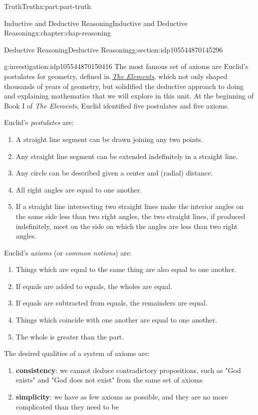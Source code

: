\documentclass[oneside,10pt,]{book}
\newcommand{\terminology}[1]{\textbf{#1}}
\numberwithin{equation}{section}
\begin{document}
\begin{partptx}{Truth}{}{Truth}{}{}{x:part:part-truth}
\begin{chapterptx}{Inductive and Deductive Reasoning}{}{Inductive and Deductive Reasoning}{}{}{x:chapter:chap-reasoning}
\begin{sectionptx}{Deductive Reasoning}{}{Deductive Reasoning}{}{}{g:section:idp105544870145296}
\begin{investigation}{}{g:investigation:idp105544870150416}%
The most famous set of axioms are Euclid's postulates for geometry, defined in \emph{\href{https://en.wikipedia.org/wiki/Euclid's_Elements}{The Elements}\footnotemark{}}, which not only shaped thousands of years of geometry, but solidified the deductive approach to doing and explaining mathematics that we will explore in this unit. At the beginning of Book I of \emph{The Elements}, Euclid identified five postulates and five axioms.%
\par
Euclid's \emph{postulates} are:%
%
\begin{enumerate}
\item{}A straight line segment can be drawn joining any two points.%
\item{}Any straight line segment can be extended indefinitely in a straight line.%
\item{}Any circle can be described given a center and (radial) distance.%
\item{}All right angles are equal to one another.%
\item{}If a straight line intersecting two straight lines make the interior angles on the same side less than two right angles, the two straight lines, if produced indefinitely, meet on the side on which the angles are less than two right angles.%
\end{enumerate}
Euclid's \emph{axioms} (or \emph{common notions}) are:%
%
\begin{enumerate}
\item{}Things which are equal to the same thing are also equal to one another.%
\item{}If equals are added to equals, the wholes are equal.%
\item{}If equals are subtracted from equals, the remainders are equal.%
\item{}Things which coincide with one another are equal to one another.%
\item{}The whole is greater than the part.%
\end{enumerate}
The desired qualities of a system of axioms are:%
%
\begin{enumerate}
\item{}\terminology{consistency}: we cannot deduce contradictory propositions, such as "God exists" and "God does not exist" from the same set of axioms%
\item{}\terminology{simplicity}: we have as few axioms as possible, and they are no more complicated than they need to be%

\end{enumerate}
\end{investigation}
\end{sectionptx}
\end{chapterptx}
\end{partptx}
\end{document}
